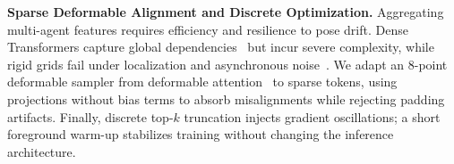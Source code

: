 \noindent\textbf{Sparse Deformable Alignment and Discrete Optimization.} Aggregating multi-agent features requires efficiency and resilience to pose drift. Dense Transformers capture global dependencies~\cite{v2xvit,v2xvitv2,dosovitskiy2020image,swin,bevformer,bevformerv2,bevnext} but incur severe complexity, while rigid grids fail under localization and asynchronous noise~\cite{coalign,trafalign,bevflow}. We adapt an 8-point deformable sampler from deformable attention~\cite{deformable_detr} to sparse tokens, using projections without bias terms to absorb misalignments while rejecting padding artifacts. Finally, discrete top-$k$ truncation injects gradient oscillations; a short foreground warm-up stabilizes training without changing the inference architecture.
